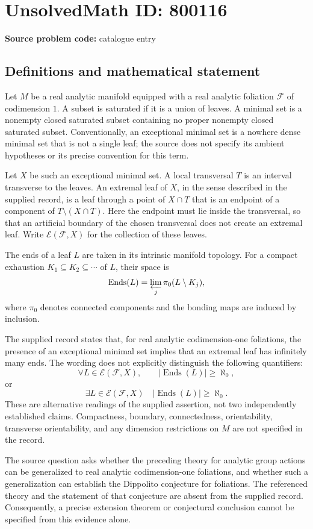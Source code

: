 \documentclass[11pt]{article}
\begin{document}
\section*{UnsolvedMath ID: 800116}
\textbf{Source problem code:} catalogue entry
\subsection{Definitions and mathematical statement}
Let \(M\) be a real analytic manifold equipped with a real analytic foliation \(\mathcal F\) of codimension \(1\). A subset is saturated if it is a union of leaves. A minimal set is a nonempty closed saturated subset containing no proper nonempty closed saturated subset. Conventionally, an exceptional minimal set is a nowhere dense minimal set that is not a single leaf; the source does not specify its ambient hypotheses or its precise convention for this term.

Let \(X\) be such an exceptional minimal set. A local transversal \(T\) is an interval transverse to the leaves. An extremal leaf of \(X\), in the sense described in the supplied record, is a leaf through a point of \(X\cap T\) that is an endpoint of a component of \(T\setminus(X\cap T)\). Here the endpoint must lie inside the transversal, so that an artificial boundary of the chosen transversal does not create an extremal leaf. Write \(\mathcal E(\mathcal F,X)\) for the collection of these leaves.

The ends of a leaf \(L\) are taken in its intrinsic manifold topology. For a compact exhaustion \(K_1\subseteq K_2\subseteq\cdots\) of \(L\), their space is
\[
\operatorname{Ends}(L)=\varprojlim_j\pi_0(L\setminus K_j),
\]
where \(\pi_0\) denotes connected components and the bonding maps are induced by inclusion.

The supplied record states that, for real analytic codimension-one foliations, the presence of an exceptional minimal set implies that an extremal leaf has infinitely many ends. The wording does not explicitly distinguish the following quantifiers:
\[
\forall L\in\mathcal E(\mathcal F,X),\qquad
\bigl|\operatorname{Ends}(L)\bigr|\geq\aleph_0,
\]
or
\[
\exists L\in\mathcal E(\mathcal F,X)\quad
\bigl|\operatorname{Ends}(L)\bigr|\geq\aleph_0.
\]
These are alternative readings of the supplied assertion, not two independently established claims. Compactness, boundary, connectedness, orientability, transverse orientability, and any dimension restrictions on \(M\) are not specified in the record.

The source question asks whether the preceding theory for analytic group actions can be generalized to real analytic codimension-one foliations, and whether such a generalization can establish the Dippolito conjecture for foliations. The referenced theory and the statement of that conjecture are absent from the supplied record. Consequently, a precise extension theorem or conjectural conclusion cannot be specified from this evidence alone.
\end{document}
